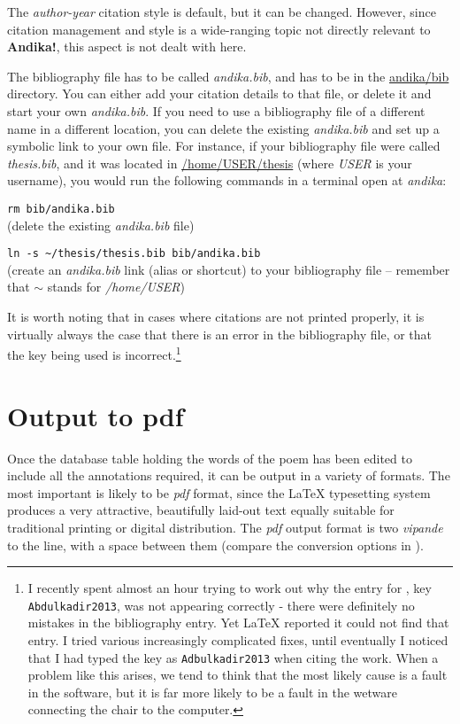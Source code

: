 The \textit{author-year} citation style is default, but it can be changed.  However, since citation management and style is a wide-ranging topic not directly relevant to \textbf{Andika!}, this aspect is not dealt with here.

The bibliography file has to be called \textit{andika.bib}, and has to be in the \url{andika/bib} directory.  You can either add your citation details to that file, or delete it and start your own \textit{andika.bib}.  If you need to use a bibliography file of a different name in a different location, you can delete the existing \textit{andika.bib} and set up a symbolic link to your own file.  For instance, if your bibliography file were called \textit{thesis.bib}, and it was located in \url{/home/USER/thesis} (where \textit{USER} is your username), you would run the following commands in a terminal open at \textit{andika}:

\verb|rm bib/andika.bib|\\
(delete the existing \textit{andika.bib} file)

\verb|ln -s ~/thesis/thesis.bib bib/andika.bib|\\
(create an \textit{andika.bib} link (alias or shortcut) to your bibliography file -- remember that $\sim$ stands for \textit{/home/USER})

It is worth noting that in cases where citations are not printed properly, it is virtually always the case that there is an error in the bibliography file, or that the key being used is incorrect.\footnote{I recently spent almost an hour trying to work out why the entry for \citet{Abdulkadir2013}, key \texttt{Abdulkadir2013}, was not appearing correctly - there were definitely no mistakes in the bibliography entry.  Yet LaTeX reported it could not find that entry.  I tried various increasingly complicated fixes, until eventually I noticed that I had typed the key as \texttt{Adbulkadir2013} when citing the work.  When a problem like this arises, we tend to think that the most likely cause is a fault in the software, but it is far more likely to be a fault in the wetware connecting the chair to the computer.}


\section{Output to pdf}
\label{s:output}

Once the database table holding the words of the poem has been edited to include all the annotations required, it can be output in a variety of formats.  The most important is likely to be \textit{pdf} format, since the LaTeX typesetting system produces a very attractive, beautifully laid-out text equally suitable for traditional printing or digital distribution.  The \textit{pdf} output format is two \textit{vipande} to the line, with a space between them (compare the conversion options in ).

